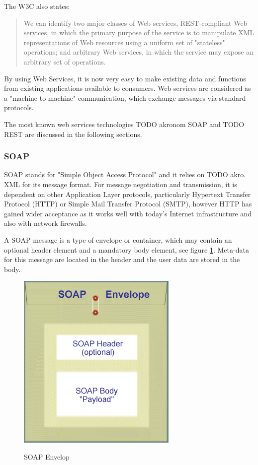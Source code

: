 The W3C also states:\cite{W3C} 
\begin{quote}
We can identify two major classes of Web services, REST-compliant Web services, in which the primary purpose of the service is to manipulate XML representations of Web resources using a uniform set of "stateless" operations; and arbitrary Web services, in which the service may expose an arbitrary set of operations.
\end{quote}

By using Web Services, it is now very easy to make existing data and functions from existing applications available to consumers. Web services are considered as a "machine to machine" communication, which  exchange messages via standard protocols.

The most known web services technologies TODO akronom SOAP and TODO REST are  discussed in the following sections.

\subsubsection{SOAP\label{sec:back_tech_ws_soap}}
SOAP stands for "Simple Object Access Protocol" and it relies on TODO akro. XML for its message format. For message negotiation and transmission, it is dependent on other Application Layer protocols, particularly Hypertext Transfer Protocol (HTTP) or Simple Mail Transfer Protocol (SMTP), however HTTP has gained wider acceptance as it works well with today's Internet infrastructure and also with network firewalls.

A SOAP message is a type of envelope or container, which may contain an optional header element and a mandatory body element, see figure \ref{fig:soap_env}. Meta-data for this message are located in the header and the user data are stored in the body.

\begin{figure}[htb]
  \centering
  \includegraphics[scale=0.5]{soap_envelope.jpg}\\
  \caption{SOAP Envelop}
  \label{fig:soap_env}
\end{figure}

